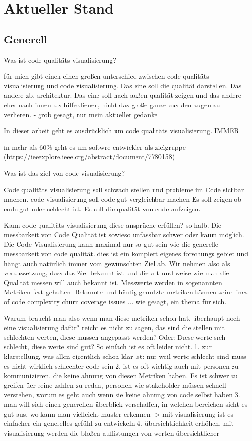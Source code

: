 \section{Aktueller Stand}\label{sec:aktStand}

\subsection{Generell} 
Was ist code qualitäts visualisierung?

für mich gibt einen einen großen unterschied zwischen code qualitäts visualisierung und code visualisierung.
Das eine soll die qualität darstellen. Das andere zb. architektur.
Das eine soll nach außen qualität zeigen und das andere eher nach innen als hilfe dienen, nicht das große ganze aus den augen zu verlieren. - grob gesagt, nur mein aktueller gedanke

In dieser arbeit geht es ausdrücklich um code qualitäts visualisierung. IMMER 

in mehr als 60\% geht es um softwre entwickler als zielgruppe (https://ieeexplore.ieee.org/abstract/document/7780158)

Was ist das ziel von code visualisierung?

Code qualitäts visualisierung soll schwach stellen und probleme im Code sichbar machen.
code visualisierung soll code gut vergleichbar machen
Es soll zeigen ob code gut oder schlecht ist.
Es soll die qualität von code aufzeigen.


Kann code qualitäts visualisierung diese ansprüche erfüllen?
so halb. Die messbarkeit von Code Qualität ist sowieso unfassbar schwer oder kaum möglich. Die Code Visualisierung kann maximal nur so gut sein wie die generelle messbarkeit von code qualität. dies ist ein komplett eigenes forschungs gebiet und hängt auch natürlich immer vom gewünschten Ziel ab.
Wir nehmen also als voraussetzung, dass das Ziel bekannt ist und die art und weise wie man die Qualität messen will auch bekannt ist.
Messwerte werden in sogenannten Metriken fest gehalten.
Bekannte und häufig genutzte metriken können sein:
lines of code
complexity
churn
coverage
issues ...
wie gesagt, ein thema für sich.


Warum braucht man also wenn man diese metriken schon hat, überhaupt noch eine visualisierung dafür?
reicht es nicht zu sagen, das sind die stellen mit schlechten werten, diese müssen angepasst werden? Oder: Diese werte sich schlecht, diese werte sind gut?
So einfach ist es oft leider nicht. 
1. zur klarstellung, was allen eigentlich schon klar ist: nur weil werte schlecht sind muss es nicht wirklich schlechter code sein
2. ist es oft wichtig auch mit personen zu kommunizieren, die keine ahnung von diesen Metriken haben. Es ist schwer zu greifen üer reine zahlen zu reden, personen wie stakeholder müssen schnell verstehen, worum es geht auch wenn sie keine ahnung von code selbst haben
3. man will sich einen generellen überblick verschaffen, in welchen bereichen sieht es gut aus, wo kann man vielleicht muster erkennen -> mit visualisierung ist es einfacher ein generelles gefühl zu entwickeln
4. übersichtlichkeit erhöhen. mit visualisierung werden die bloßen auflistungen von werten übersichtlicher



